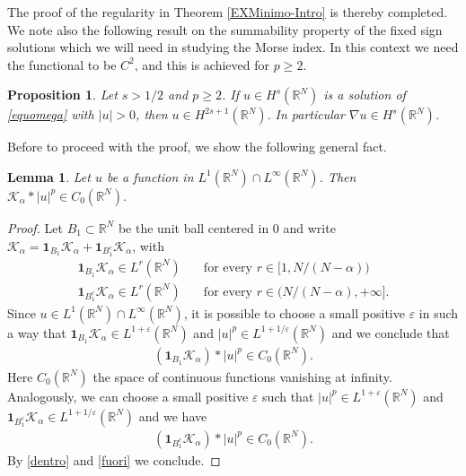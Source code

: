 \documentclass[10pt]{amsart}
\numberwithin{equation}{section}
\newtheorem{lemma}[theorem]{Lemma}
\newtheorem{proposition}[theorem]{Proposition}
\begin{document}
\noindent The proof of the regularity in Theorem \ref{EXMinimo-Intro} is thereby completed. \\
\noindent We note also the following result on the summability property of the fixed sign solutions
which we will need in studying the Morse index. In this context we need the functional to be
$C^{2}$, and this is achieved for $p\geq2$. 

\begin{proposition}\label{le:dif}
Let $s> 1/2$ and $p\geq 2$. If $u\in H^{s}(\mathbb R^{N})$ is a solution of \eqref{equomega} with $|u|>0$, then $u\in H^{2s+1}(\mathbb R^{N}).$
In particular $\nabla u\in H^{s}(\mathbb R^{N})$.
\end{proposition}

\noindent
Before to proceed with the proof, we show the following general fact.
\begin{lemma}\label{le:regolare}
Let $u$ be a function in $L^{1}(\mathbb R^{N})\cap L^{\infty}(\mathbb R^{N})$. Then 
$\mathcal K_{\alpha}*|u|^{p}\in C_{0}(\mathbb R^{N}).$
\end{lemma}
\begin{proof}
Let $B_{1}\subset \mathbb R^{N}$ be the unit ball centered in $0$ and write
$\mathcal K_{\alpha}=\mathbf 1_{B_1}\mathcal K_{\alpha}+\mathbf 1_{B_{1}^c}\mathcal K_{\alpha}$,
with 
\begin{align*}
\mathbf 1_{B_{1}}\mathcal K_{\alpha}\in L^{r}(\mathbb R^{N})
&
\quad\text{for every } r\in [1, N/(N-\alpha)) \\
\mathbf 1_{ B_{1}^{c}}\mathcal K_{\alpha}\in L^{r}(\mathbb R^{N})
&
\quad\text{for every }  r \in (N/(N-\alpha),+\infty].
\end{align*}
Since  $u\in L^{1}(\mathbb R^{N})\cap L^{\infty}(\mathbb R^{N})$, 
 it is possible to  choose a small positive $\varepsilon$ in such a way that
$\mathbf 1_{B_{1}}\mathcal K_{\alpha}\in L^{1+\varepsilon}(\mathbb R^{N})$ and 
$|u|^{p}\in L^{1+1/\varepsilon}(\mathbb R^{N})$ and we conclude that
\begin{eqnarray}\label{dentro}
(\mathbf 1_{B_{1}}\mathcal K_{\alpha}) * |u|^{p}\in C_{0}(\mathbb R^{N}).
\end{eqnarray}
Here $C_{0}(\mathbb R^{N})$ the space of continuous functions vanishing at infinity.
Analogously, we can choose a small positive $\varepsilon$ such that 
$|u|^{p}\in L^{1+\varepsilon}(\mathbb R^{N})$ and  
$\mathbf 1_{ B_{1}^{c}}\mathcal K_{\alpha}\in L^{1+1/\varepsilon}(\mathbb R^{N})$ and we have
\begin{eqnarray}\label{fuori}
(\mathbf 1_{B_{1}^{c}}\mathcal K_{\alpha} )* |u|^{p}\in C_{0}(\mathbb R^{N}).
\end{eqnarray}
By \eqref{dentro} and \eqref{fuori} we conclude.
\end{proof}
\end{document}
